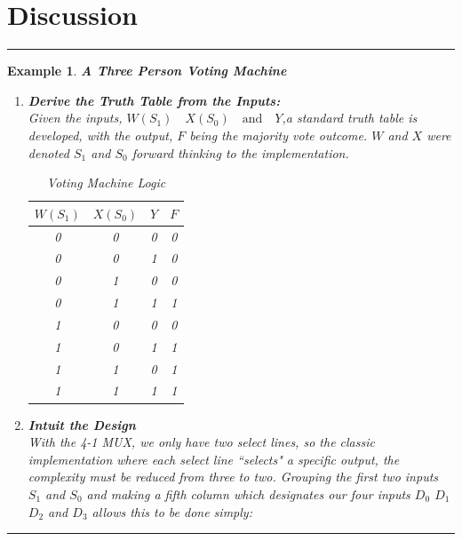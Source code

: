 \documentclass[12pt]{article}
\newtheorem{example}{Example}
\newenvironment{examp}
{
	\vspace{.5cm}
	\hrule
\begin{example}\upshape}
	{\hrule
		\vspace{0.5cm}
\end{example}}
\begin{document}
\section*{Discussion}
\begin{examp}
	\vspace{.5cm}
	\textbf{A Three Person Voting Machine}
	\begin{enumerate}
		\item \textbf{Derive the Truth Table from the Inputs:}\\
		      Given the inputs, \(W (S_1) \quad X (S_0) \quad \text{and}\quad Y\),a standard
		      truth table is developed, with the output, \(F\) being the majority
		      vote outcome.
		      \(W\) and \(X\) were denoted \(S_1\) and \(S_0\) forward
		      thinking to the implementation.
		      \begin{table}[H]
			      \centering
			      \begin{tabular}{|c|c|c|c|}
				      \hline
				      \(W (S_1)\) & \(X (S_0)\) & \(Y\) & \(F\) \\
				      \hline
				      0           & 0           & 0     & 0     \\
				      0           & 0           & 1     & 0     \\
				      0           & 1           & 0     & 0     \\
				      0           & 1           & 1     & 1     \\
				      1           & 0           & 0     & 0     \\
				      1           & 0           & 1     & 1     \\
				      1           & 1           & 0     & 1     \\
				      1           & 1           & 1     & 1     \\
				      \hline
			      \end{tabular}
			      \caption{Voting Machine Logic}
		      \end{table}
		\item \textbf{Intuit the Design}\\
		      With the 4-1 MUX, we only have two select lines, so the classic
		      implementation where each select line ``selects" a specific output, the
		      complexity must be reduced from three to two.
		      Grouping the first two inputs \(S_1\) and \(S_0\) and making a fifth column which designates
		      our four inputs \(D_0\) \(D_1\) \(D_2\) and \(D_3\) allows this to be
		      done simply:
		      \begin{table}[H]

\end{table}
\end{enumerate}
\end{examp}
\end{document}
